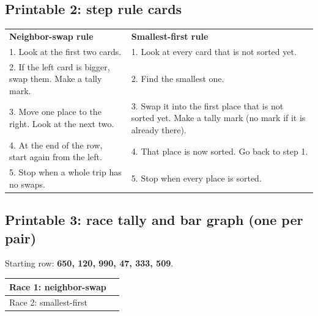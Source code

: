 \subsection*{Printable 2: step rule cards}
\begin{center}
\renewcommand{\arraystretch}{1.4}
\begin{tabular}{|p{7cm}|p{7cm}|}
\hline
\textbf{Neighbor-swap rule} & \textbf{Smallest-first rule}\\
1. Look at the first two cards. & 1. Look at every card that is not sorted yet.\\
2. If the left card is bigger, swap them. Make a tally mark. & 2. Find the smallest one.\\
3. Move one place to the right. Look at the next two. & 3. Swap it into the first place that is not sorted yet. Make a tally mark (no mark if it is already there).\\
4. At the end of the row, start again from the left. & 4. That place is now sorted. Go back to step 1.\\
5. Stop when a whole trip has no swaps. & 5. Stop when every place is sorted.\\ \hline
\end{tabular}
\end{center}

\subsection*{Printable 3: race tally and bar graph (one per pair)}
Starting row: \textbf{650, 120, 990, 47, 333, 509}.
\begin{center}
\Large\renewcommand{\arraystretch}{1.6}
\begin{tabular}{|p{5cm}|p{7cm}|}
\hline
Race 1: neighbor-swap & \\ \hline
Race 2: smallest-first & \\ \hline
\end{tabular}
\end{center}
\begin{center}
\end{center}

